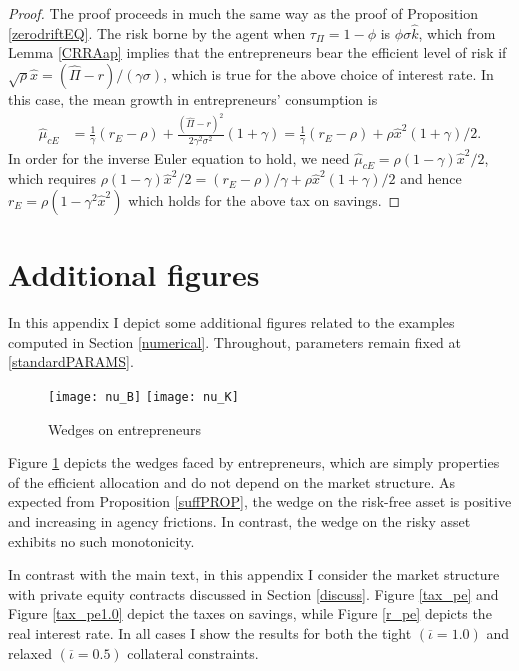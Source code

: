 \documentclass[11pt]{article}
\theoremstyle{plain}
\theoremstyle{definition} %
\begin{document}
\begin{proof}
The proof proceeds in much the same way as the proof of Proposition \ref{zerodriftEQ}. The risk borne by the agent when $\tau_{\Pi} = 1-\phi$ is $\phi \sigma \hat{k}$, which from Lemma \ref{CRRAap} implies that the entrepreneurs bear the efficient level of risk if $\sqrt{\rho} \hat{x} = (\hat{\Pi} - r)/(\gamma \sigma)$, which is true for the above choice of interest rate. In this case, the mean growth in entrepreneurs' consumption is
\begin{align*}
\hat{\mu}_{cE} & = \frac{1}{\gamma}(r_E - \rho) + \frac{(\hat{\Pi} - r)^2}{2\gamma^2\sigma^2}(1+\gamma) 
 = \frac{1}{\gamma}(r_E - \rho) + \rho \hat{x}^2(1+\gamma)/2.
\end{align*}
In order for the inverse Euler equation to hold, we need $\hat{\mu}_{cE} = \rho(1-\gamma)\hat{x}^2/2$, which requires $\rho(1-\gamma)\hat{x}^2/2 = (r_E - \rho)/\gamma + \rho \hat{x}^2(1+\gamma)/2$ and hence $r_E = \rho(1 - \gamma^2 \hat{x}^2)$ which holds for the above tax on savings. 
\end{proof}

\section{Additional figures} \label{figuresAPP}

In this appendix I depict some additional figures related to the examples computed in Section \ref{numerical}. Throughout, parameters remain fixed at \eqref{standardPARAMS}.

\begin{figure}[H]
\centering
\texttt{[image: nu\_B]}
\texttt{[image: nu\_K]}
\caption{Wedges on entrepreneurs}
\label{wedge} 
\end{figure} 

Figure \ref{wedge} depicts the wedges faced by entrepreneurs, which are simply properties of the efficient allocation and do not depend on the market structure. As expected from Proposition \ref{suffPROP}, the wedge on the risk-free asset is positive and increasing in agency frictions. In contrast, the wedge on the risky asset exhibits no such monotonicity. 

In contrast with the main text, in this appendix I consider the market structure with private equity contracts discussed in Section \ref{discuss}. Figure \ref{tax_pe} and Figure \ref{tax_pe1.0} depict the taxes on savings, while Figure \ref{r_pe} depicts the real interest rate. In all cases I show the results for both the tight $(\overline{\iota} = 1.0)$ and relaxed $(\overline{\iota} = 0.5)$ collateral constraints. 
\end{document}
